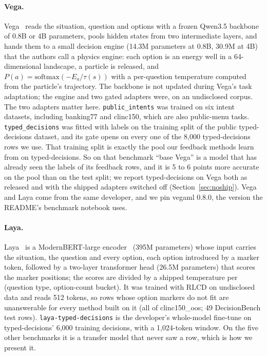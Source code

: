 \documentclass[11pt]{article}
\begin{document}
\paragraph{Vega.}
Vega~\citep{vegaml} reads the situation, question and options with a frozen Qwen3.5 backbone~\citep{qwen35small,qwen35big} of 0.8B or 4B parameters, pools hidden states from two intermediate layers, and hands them to a small decision engine (14.3M parameters at 0.8B, 30.9M at 4B) that the authors call a physics engine: each option is an energy well in a 64-dimensional landscape, a particle is released, and $P(a) = \mathrm{softmax}(-E_a/\tau(s))$ with a per-question temperature computed from the particle's trajectory. The backbone is not updated during Vega's task adaptation; the engine and two gated adapters were, on an undisclosed corpus. The two adapters matter here. \texttt{public\_intents} was trained on six intent datasets, including banking77 and clinc150, which are also public-menu tasks. \texttt{typed\_decisions} was fitted with labels on the training split of the public typed-decisions dataset, and its gate opens on every one of the 8,000 typed-decisions rows we use. That training split is exactly the pool our feedback methods learn from on typed-decisions. So on that benchmark ``base Vega'' is a model that has already seen the labels of its feedback rows, and it is 5 to 6 points more accurate on the pool than on the test split; we report typed-decisions on Vega both as released and with the shipped adapters switched off (Section~\ref{sec:noship}). Vega and Laya come from the same developer, and we pin vegaml 0.8.0, the version the README's benchmark notebook uses.

\paragraph{Laya.}
Laya~\citep{laya} is a ModernBERT-large encoder~\citep{warner2024modernbert} (395M parameters) whose input carries the situation, the question and every option, each option introduced by a marker token, followed by a two-layer transformer head (26.5M parameters) that scores the marker positions; the scores are divided by a shipped temperature per (question type, option-count bucket). It was trained with RLCD on undisclosed data and reads 512 tokens, so rows whose option markers do not fit are unanswerable for every method built on it (all of clinc150\_oos; 49 DecisionBench test rows). \texttt{laya-typed-decisions} is the developer's whole-model fine-tune on typed-decisions' 6,000 training decisions, with a 1,024-token window. On the five other benchmarks it is a transfer model that never saw a row, which is how we present it.
\end{document}
